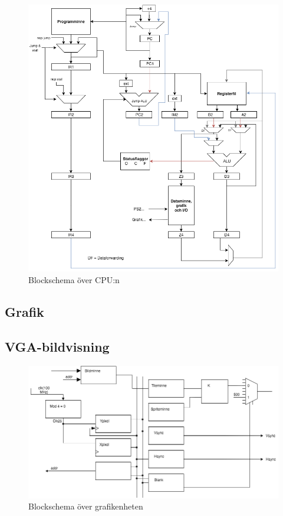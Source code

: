 \documentclass[a4paper,titlepage]{article}
\begin{document}
\begin{figure}[H]
	\centering
\includegraphics[width=14cm]{../images/CPU.png}
	\caption{Blockschema över CPU:n}
\end{figure}

\subsection{Grafik}


\subsection{VGA-bildvisning}

\begin{figure}[H]
	\centering
\includegraphics[width=14cm]{../images/vga-schema.png}
	\caption{Blockschema över grafikenheten}
\end{figure}
\end{document}

